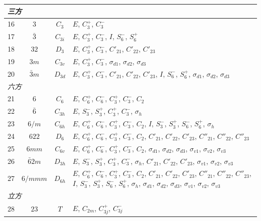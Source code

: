 \begin{table}[H]
\begin{tabular}{|c|c|c|p{}|}
\multicolumn{4}{|l|}{\textit{三方}} \\ \hline
16 & $3$ & $C_{3}$ & $E$, $C_{3}^{+}$, $C_{3}^{-}$ \\ \hline
17 & $\bar{3}$ & $C_{3i}$ & $E$, $C_{3}^{+}$, $C_{3}^{-}$, $I$, $S_{6}^{-}$, $S_{6}^{+}$ \\ \hline
18 & $32$ & $D_{3}$ & $E$, $C_{3}^{+}$, $C_{3}^{-}$, $C'_{21}$, $C'_{22}$, $C'_{23}$ \\ \hline
19 & $3m$ & $C_{3v}$ & $E$, $C_{3}^{+}$, $C_{3}^{-}$, $\sigma_{d1}$, $\sigma_{d2}$, $\sigma_{d3}$ \\ \hline
20 & $\bar{3}m$ & $D_{3d}$ & $E$, $C_{3}^{+}$, $C_{3}^{-}$, $C'_{21}$, $C'_{22}$, $C'_{23}$, $I$, $S_{6}^{-}$, $S_{6}^{+}$, $\sigma_{d1}$, $\sigma_{d2}$, $\sigma_{d3}$ \\ \hline
\multicolumn{4}{|l|}{\textit{六方}} \\ \hline
21 & $6$ & $C_{6}$ & $E$, $C_{6}^{+}$, $C_{6}^{-}$, $C_{3}^{+}$, $C_{3}^{-}$, $C_{2}$ \\ \hline
22 & $\bar{6}$ & $C_{3h}$ & $E$, $S_{3}^{-}$, $S_{3}^{+}$, $C_{3}^{+}$, $C_{3}^{-}$, $\sigma_{h}$ \\ \hline
23 & $6/m$ & $C_{6h}$ & $E$, $C_{6}^{+}$, $C_{6}^{-}$, $C_{3}^{+}$, $C_{3}^{-}$, $C_{2}$, $I$, $S_{3}^{-}$, $S_{3}^{+}$, $S_{6}^{-}$, $S_{6}^{+}$, $\sigma_{h}$ \\ \hline
24 & $622$ & $D_{6}$ & $E$, $C_{6}^{+}$, $C_{6}^{-}$, $C_{3}^{+}$, $C_{3}^{-}$, $C_{2}$, $C'_{21}$, $C'_{22}$, $C'_{23}$, $C''_{21}$, $C''_{22}$, $C''_{23}$ \\ \hline
25 & $6mm$ & $C_{6v}$ & $E$, $C_{6}^{+}$, $C_{6}^{-}$, $C_{3}^{+}$, $C_{3}^{-}$, $C_{2}$, $\sigma_{d1}$, $\sigma_{d2}$, $\sigma_{d3}$, $\sigma_{v1}$, $\sigma_{v2}$, $\sigma_{v3}$ \\ \hline
26 & $\bar{6}2m$ & $D_{3h}$ & $E$, $S_{3}^{-}$, $S_{3}^{+}$, $C_{3}^{+}$, $C_{3}^{-}$, $\sigma_{h}$, $C'_{21}$, $C'_{22}$, $C'_{23}$, $\sigma_{v1}$, $\sigma_{v2}$, $\sigma_{v3}$ \\ \hline
27 & $6/mmm$ & $D_{6h}$ & $E$, $C_{6}^{+}$, $C_{6}^{-}$, $C_{3}^{+}$, $C_{3}^{-}$, $C_{2}$, $C'_{21}$, $C'_{22}$, $C'_{23}$, $C''_{21}$, $C''_{22}$, $C''_{23}$, $I$, $S_{3}^{-}$, $S_{3}^{+}$, $S_{6}^{-}$, $S_{6}^{+}$, $\sigma_{h}$, $\sigma_{d1}$, $\sigma_{d2}$, $\sigma_{d3}$, $\sigma_{v1}$, $\sigma_{v2}$, $\sigma_{v3}$ \\ \hline
\multicolumn{4}{|l|}{\textit{立方}} \\ \hline
28 & $23$ & $T$ & $E$, $C_{2m}$, $C_{3j}^{+}$, $C_{3j}^{-}$ \\ \hline

\end{tabular}
\end{table}
